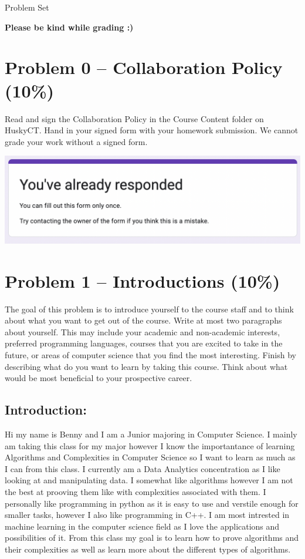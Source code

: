 \documentclass[12pt,letterpaper]{article}
\begin{document}
\begin{center}
    \LARGE Problem Set
\end{center}
\begin{center}
    \textbf{Please be kind while grading :)}    
\end{center}


\section*{Problem 0 -- Collaboration Policy (10\%)}
Read and sign the Collaboration Policy in the Course Content folder on HuskyCT.
Hand in your signed form with your homework submission.
We cannot grade your work without a signed form.
\begin{center}
    \includegraphics[scale=.7]{images/confirm.png}    
\end{center}


\section*{Problem 1 -- Introductions (10\%)}
The goal of this problem is to introduce yourself to the course staff and to think about what you want to get out of the course.
Write at most two paragraphs about yourself.
This may include your academic and non-academic interests, preferred programming languages, courses that you are excited to take in the future, or areas of computer science that you find the most interesting.
Finish by describing what do you want to learn by taking this course.
Think about what would be most beneficial to your prospective career.

\subsection*{Introduction:}
Hi my name is Benny and I am a Junior majoring in Computer Science. I mainly am taking this class
for my major however I know the importantance of learning Algorithms and Complexities in Computer Science 
so I want to learn as much as I can from this class. I currently am a Data Analytics concentration as 
I like looking at and manipulating data. I somewhat like algorithms however I am not the best at prooving them
like with complexities associated with them. I personally like programming in python as it is easy to use and 
verstile enough for smaller tasks, however I also like programming in C++. I am most intrested in machine learning
in the computer science field as I love the applications and possibilities of it. From this class my goal is to learn 
how to prove algorithms and their complexities as well as learn more about the different types of algorithms. 
\newpage
\end{document}
